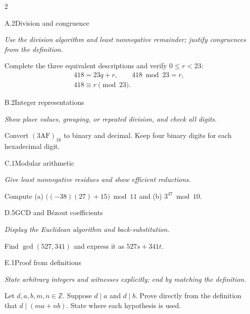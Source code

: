 \documentclass[9pt]{extarticle}
\begin{document}
\begin{multicols}{2}
\begin{CoreProblem}{A.2}{Division and congruence}
{\scriptsize\textit{Use the division algorithm and least nonnegative remainder; justify congruences from the definition.}\par}
Complete the three equivalent descriptions and verify $0\le r<23$:
\[
\begin{gathered}
418=23q+r,\qquad 418\bmod 23=r,\\
418\equiv r\pmod{23}.
\end{gathered}
\]
\end{CoreProblem}
\begin{CoreProblem}{B.2}{Integer representations}
{\scriptsize\textit{Show place values, grouping, or repeated division, and check all digits.}\par}
Convert $(\mathrm{3AF})_{16}$ to binary and decimal. Keep four binary digits
for each hexadecimal digit.
\end{CoreProblem}
\begin{CoreProblem}{C.1}{Modular arithmetic}
{\scriptsize\textit{Give least nonnegative residues and show efficient reductions.}\par}
Compute (a) $\bigl((-38)(27)+15\bigr)\bmod11$ and
(b) $3^{47}\bmod10$.
\end{CoreProblem}
\columnbreak
\begin{CoreProblem}{D.5}{GCD and B\'ezout coefficients}
{\scriptsize\textit{Display the Euclidean algorithm and back-substitution.}\par}
Find $\gcd(527,341)$ and express it as $527s+341t$.
\end{CoreProblem}
\begin{CoreProblem}{E.1}{Proof from definitions}
{\scriptsize\textit{State arbitrary integers and witnesses explicitly; end by matching the definition.}\par}
Let $d,a,b,m,n\in\mathbb Z$. Suppose $d\mid a$ and $d\mid b$. Prove directly
from the definition that $d\mid(ma+nb)$. State where each hypothesis is used.
\end{CoreProblem}
\end{multicols}
\CoreWorkArea
\FormBreak
{}
\end{document}
